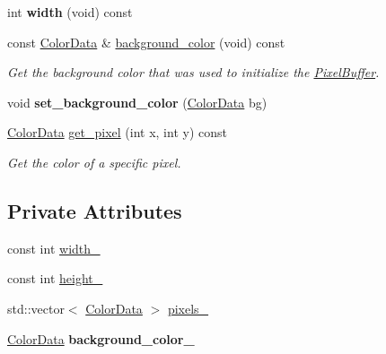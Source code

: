 \begin{DoxyCompactItemize}
\item 
int {\bfseries width} (void) const \hypertarget{classimage__tools_1_1PixelBuffer_a6143b06b081402013a5f346222b2ab5f}{}\label{classimage__tools_1_1PixelBuffer_a6143b06b081402013a5f346222b2ab5f}

\item 
const \hyperlink{classimage__tools_1_1ColorData}{Color\+Data} \& \hyperlink{classimage__tools_1_1PixelBuffer_a56ac2b6b21368d04a71d6a615eebdd33}{background\+\_\+color} (void) const 
\begin{DoxyCompactList}\small\item\em Get the background color that was used to initialize the \hyperlink{classimage__tools_1_1PixelBuffer}{Pixel\+Buffer}. \end{DoxyCompactList}\item 
void {\bfseries set\+\_\+background\+\_\+color} (\hyperlink{classimage__tools_1_1ColorData}{Color\+Data} bg)\hypertarget{classimage__tools_1_1PixelBuffer_acd1b843e6e91bd95f8386380c8def879}{}\label{classimage__tools_1_1PixelBuffer_acd1b843e6e91bd95f8386380c8def879}

\item 
\hyperlink{classimage__tools_1_1ColorData}{Color\+Data} \hyperlink{classimage__tools_1_1PixelBuffer_af1a9e6d73a1a1fde15e4dbeff335c376}{get\+\_\+pixel} (int x, int y) const 
\begin{DoxyCompactList}\small\item\em Get the color of a specific pixel. \end{DoxyCompactList}\end{DoxyCompactItemize}
\subsection*{Private Attributes}
\begin{DoxyCompactItemize}
\item 
const int \hyperlink{classimage__tools_1_1PixelBuffer_ac67206a6b428c7b33bd7f90f65b8c171}{width\+\_\+}
\item 
const int \hyperlink{classimage__tools_1_1PixelBuffer_ae104466eae109324a4a0daa0bc14c980}{height\+\_\+}
\item 
std\+::vector$<$ \hyperlink{classimage__tools_1_1ColorData}{Color\+Data} $>$ \hyperlink{classimage__tools_1_1PixelBuffer_a0c52483e7e29f111acf98474105f2409}{pixels\+\_\+}
\item 
\hyperlink{classimage__tools_1_1ColorData}{Color\+Data} {\bfseries background\+\_\+color\+\_\+}\hypertarget{classimage__tools_1_1PixelBuffer_a67c70e090217b58856633ff35d499de2}{}\label{classimage__tools_1_1PixelBuffer_a67c70e090217b58856633ff35d499de2}

\end{DoxyCompactItemize}


